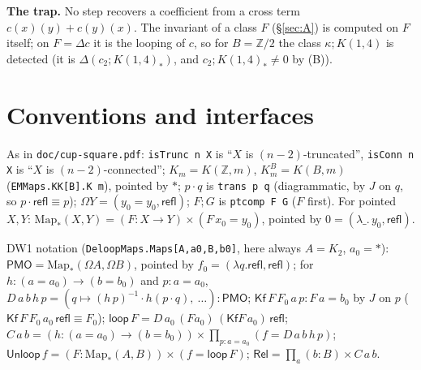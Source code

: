 \documentclass[11pt]{amsart}
\theoremstyle{definition}
\theoremstyle{remark}
\newcommand{\Om}{\Omega}
\newcommand{\Map}{\mathrm{Map}_*}
\newcommand{\Z}{\mathbb{Z}}
\newcommand{\code}[1]{\texttt{#1}}
\newcommand{\refl}{\mathsf{refl}}
\newcommand{\lp}{\mathsf{loop}}
\newcommand{\Kf}{\mathsf{Kf}}
\newcommand{\Unl}{\mathsf{Unloop}}
\newcommand{\PMO}{\mathsf{PMO}}
\begin{document}
\smallskip\noindent\textbf{The trap.} No step recovers a coefficient from
a cross term $c(x)(y)+c(y)(x)$. The invariant of a class $F$
(\S\ref{sec:A}) is computed on $F$ itself; on $F=\Delta c$ it is the
looping of $c$, so for $B=\Z/2$ the class $\kappa;K(1,4)$ is detected
(it is $\Delta(c_2;K(1,4)_*)$, and $c_2;K(1,4)_*\neq 0$ by (B)).

\section{Conventions and interfaces}\label{sec:conv}

As in \code{doc/cup-square.pdf}: \code{isTrunc n X} is ``$X$ is
$(n-2)$-truncated'', \code{isConn n X} is ``$X$ is $(n-2)$-connected'';
$K_m=K(\Z,m)$, $K^B_m=K(B,m)$ (\code{EMMaps.KK[B].K m}), pointed by $*$;
$p\cdot q$ is \code{trans p q} (diagrammatic, by $J$ on $q$, so
$p\cdot\refl\equiv p$); $\Om Y=(y_0=y_0,\refl)$; $F;G$ is \code{ptcomp F G}
($F$ first). For pointed $X,Y$: $\Map(X,Y)=(F:X\to Y)\times(F\,x_0=y_0)$,
pointed by $0=(\lambda\_.\,y_0,\refl)$.

DW1 notation (\code{DeloopMaps.Maps[A,a0,B,b0]}, here always $A=K_2$,
$a_0=*$): $\PMO=\Map(\Om A,\Om B)$, pointed by
$f_0=(\lambda q.\refl,\refl)$;
for $h:(a=a_0)\to(b=b_0)$ and $p:a=a_0$,
$D\,a\,b\,h\,p=(q\mapsto (h\,p)^{-1}\cdot h(p\cdot q),\ \ldots):\PMO$;
$\Kf\,F\,F_0\,a\,p:F\,a=b_0$ by $J$ on $p$ ($\Kf\,F\,F_0\,a_0\,\refl\equiv F_0$);
$\lp\,F=D\,a_0\,(F a_0)\,(\Kf F\,a_0)\,\refl$;
$C\,a\,b=(h:(a=a_0)\to(b=b_0))\times\prod_{p:a=a_0}(f=D\,a\,b\,h\,p)$;
$\Unl\,f=(F:\Map(A,B))\times(f=\lp\,F)$; $\mathsf{Rel}=\prod_a(b:B)\times C\,a\,b$.
\end{document}
